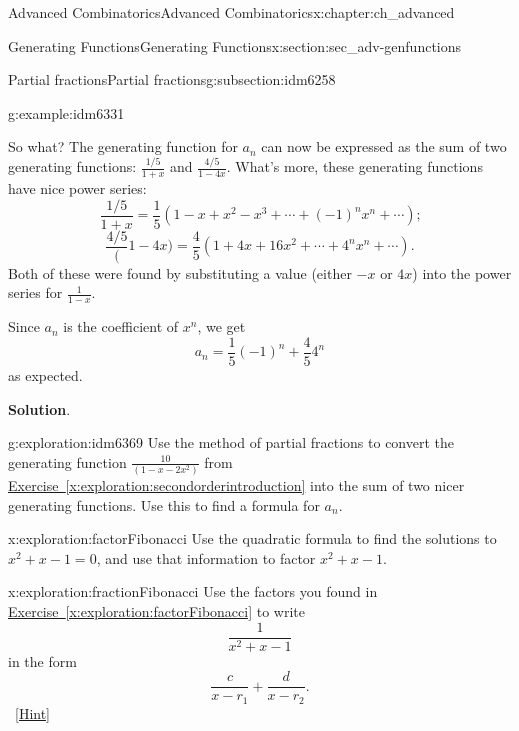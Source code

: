 \documentclass[oneside,10pt,]{book}
\numberwithin{equation}{chapter}
\begin{document}
\begin{chapterptx}{Advanced Combinatorics}{}{Advanced Combinatorics}{}{}{x:chapter:ch_advanced}
\begin{sectionptx}{Generating Functions}{}{Generating Functions}{}{}{x:section:sec_adv-genfunctions}
\begin{subsectionptx}{Partial fractions}{}{Partial fractions}{}{}{g:subsection:idm6258}
\begin{example}{}{g:example:idm6331}
\par
So what?  The generating function for \(a_n\) can now be expressed as the sum of two generating functions: \(\frac{1/5}{1+x}\) and \(\frac{4/5}{1-4x}\).  What's more, these generating functions have nice power series:%
\begin{equation*}
\frac{1/5}{1+x} = \frac{1}{5}\left( 1-x+x^2-x^3+\cdots +(-1)^nx^n+\cdots\right)\text{;}
\end{equation*}
%
\begin{equation*}
\frac{4/5}(1-4x) = \frac{4}{5} \left(1+4x + 16x^2 + \cdots + 4^nx^n+ \cdots \right)\text{.}
\end{equation*}
Both of these were found by substituting a value (either \(-x\) or \(4x\)) into the power series for \(\frac{1}{1-x}\).%
\par
Since \(a_n\) is the coefficient of \(x^n\), we get%
\begin{equation*}
a_n = \frac{1}{5}(-1)^n + \frac{4}{5}4^n
\end{equation*}
as expected.%
\par\smallskip%
\noindent\textbf{Solution}.\hypertarget{g:solution:idm6367}{}\quad{}%
\end{example}
\begin{exploration}{}{g:exploration:idm6369}%
Use the method of partial fractions to convert the generating function \(\frac{10}{(1-x-2x^2)}\) from \hyperref[x:exploration:secondorderintroduction]{Exercise~\ref{x:exploration:secondorderintroduction}} into the sum of two nicer generating functions. Use this to find a formula for \(a_n\).%
\end{exploration}
\begin{exploration}{}{x:exploration:factorFibonacci}%
Use the quadratic formula to find the solutions to \(x^2+x-1=0\), and use that information to factor \(x^2+x-1\).%
\end{exploration}
\begin{exploration}{}{x:exploration:fractionFibonacci}%
Use the factors you found in \hyperref[x:exploration:factorFibonacci]{Exercise~\ref{x:exploration:factorFibonacci}} to write%
\begin{equation*}
\frac{1}{x^2+x-1}
\end{equation*}
in the form%
\begin{equation*}
\frac{c}{x-r_1} + \frac{d}{x-r_2}.
\end{equation*}
%
\qquad~\hfill{\tiny\hyperlink{g:hint:idm6405-back}{[Hint]}}\end{exploration}
%

\end{subsectionptx}
\end{sectionptx}
\end{chapterptx}
\end{document}
